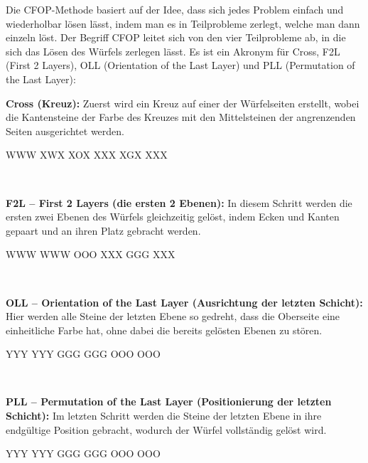 Die CFOP-Methode basiert auf der Idee, dass sich jedes Problem einfach und wiederholbar lösen lässt, indem man es in Teilprobleme zerlegt, welche man dann einzeln löst.
Der Begriff CFOP leitet sich von den vier Teilprobleme ab, in die sich das Lösen des Würfels zerlegen lässt.
Es ist ein Akronym für Cross, F2L (First 2 Layers), OLL (Orientation of the Last Layer) und PLL (Permutation of the Last Layer):\\[1em]
\parbox{0.7\linewidth}{
\textbf{Cross (Kreuz):} Zuerst wird ein Kreuz auf einer der Würfelseiten erstellt, wobei die Kantensteine der Farbe des Kreuzes mit den Mittelsteinen der angrenzenden Seiten ausgerichtet werden.
}\parbox{0.3\linewidth}{
\centering
\RubikCubeGreyAll%
            {W}{W}{W}
            {X}{W}{X}%
	       {X}{O}{X}
	       {X}{X}{X}%
	       {X}{G}{X}
	       {X}{X}{X}%
}\\[1em]
\parbox{0.7\linewidth}{
\textbf{F2L -- First 2 Layers (die ersten 2 Ebenen):}
In diesem Schritt werden die ersten zwei Ebenen des Würfels gleichzeitig gelöst, indem Ecken und Kanten gepaart und an ihren Platz gebracht werden.
}\parbox{0.3\linewidth}{
\centering
\RubikCubeGreyAll%
            {W}{W}{W}
            {W}{W}{W}%
	       {O}{O}{O}
	       {X}{X}{X}%
	       {G}{G}{G}
	       {X}{X}{X}%
}\\[1em]
\parbox{0.7\linewidth}{
  \textbf{OLL -- Orientation of the Last Layer (Ausrichtung der letzten Schicht):}
  Hier werden alle Steine der letzten Ebene so gedreht, dass die Oberseite eine einheitliche Farbe hat, ohne dabei die bereits gelösten Ebenen zu stören.
}\parbox{0.3\linewidth}{
\centering
\RubikCubeGreyAll%
            {Y}{Y}{Y}
            {Y}{Y}{Y}%
	       {G}{G}{G}
	       {G}{G}{G}%
	       {O}{O}{O}
	       {O}{O}{O}%
}\\[1em]
\parbox{0.7\linewidth}{
  \textbf{PLL -- Permutation of the Last Layer (Positionierung der letzten Schicht):} 
  Im letzten Schritt werden die Steine der letzten Ebene in ihre endgültige Position gebracht, wodurch der Würfel vollständig gelöst wird.
}\parbox{0.3\linewidth}{
\centering
\RubikCubeGreyAll%
            {Y}{Y}{Y}
            {Y}{Y}{Y}%
	       {G}{G}{G}
	       {G}{G}{G}%
	       {O}{O}{O}
	       {O}{O}{O}%
}\\[1em]

